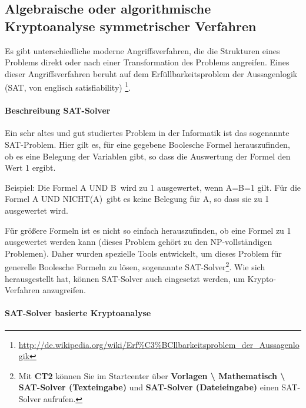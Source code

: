 \begin{refsegment}
\subsection{Algebraische oder algorithmische Kryptoanalyse symmetrischer Verfahren}
\label{cm_Algebraic-versus-Symmetr}

Es gibt unterschiedliche moderne Angriffsverfahren, die die Strukturen eines Problems direkt oder nach einer Transformation des Problems angreifen. Eines dieser Angriffsverfahren beruht auf dem Erfüllbarkeitsproblem der Aussagenlogik (SAT, von englisch satisfiability)%
\footnote{%
 \url{http://de.wikipedia.org/wiki/Erf%C3%BCllbarkeitsproblem_der_Aussagenlogik}
}.


\paragraph*{Beschreibung SAT-Solver}\mbox{}
\hypertarget{ht_SAT-Solver}{}

Ein sehr altes und gut studiertes Problem in der Informatik ist das sogenannte SAT-Problem. Hier gilt es, für eine gegebene Boolesche Formel herauszufinden, ob es eine Belegung der Variablen gibt, so dass die Auswertung der Formel den Wert 1 ergibt.

Beispiel: Die Formel \glqq A UND B\grqq~wird zu 1 ausgewertet, wenn A=B=1 gilt. Für die Formel \glqq A UND NICHT(A)\grqq~gibt es keine Belegung für A, so dass sie zu 1 ausgewertet wird.

Für größere Formeln ist es nicht so einfach herauszufinden, ob eine Formel zu 1 ausgewertet werden kann (dieses Problem gehört zu den NP-vollständigen Problemen). Daher wurden spezielle Tools entwickelt, um dieses Problem für generelle Boolesche Formeln zu lösen, sogenannte SAT-Solver\footnote{
    Mit {\bf CT2} können Sie im Startcenter
    über {\bf Vorlagen \textbackslash{} Mathematisch \textbackslash{}
    SAT-Solver (Texteingabe)}  und  {\bf SAT-Solver (Dateieingabe)} einen
    SAT-Solver aufrufen.
    }. Wie sich herausgestellt hat, können SAT-Solver auch eingesetzt werden, um Krypto-Verfahren
anzugreifen.


\paragraph*{SAT-Solver basierte Kryptoanalyse}\mbox{}
\hypertarget{ht_SAT-Solver_Cryptanalysis}{}


\end{refsegment}
